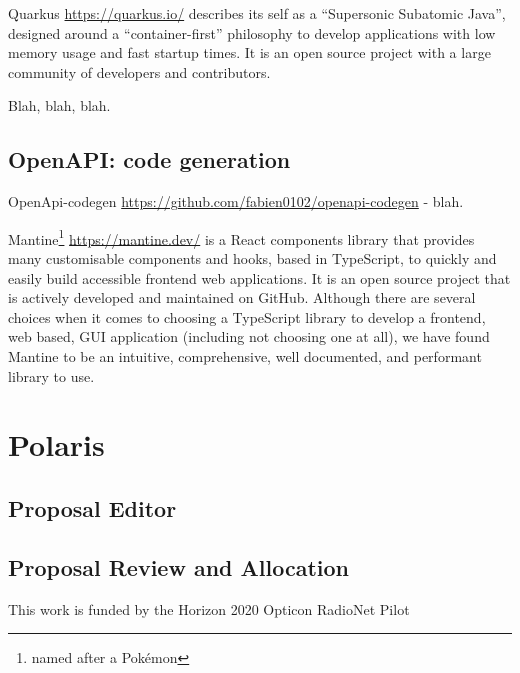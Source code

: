 \documentclass[11pt,twoside]{article}
\begin{document}
Quarkus \url{https://quarkus.io/} describes its self as a ``Supersonic Subatomic Java'', designed around a
``container-first'' philosophy to develop applications with low memory usage and fast startup times.
It is an open source project with a large community of developers and contributors.

Blah, blah, blah.

\subsection{OpenAPI: code generation}\label{subsec:openapi-code-generation}

OpenApi-codegen \url{https://github.com/fabien0102/openapi-codegen}  - blah.


Mantine\footnote{named after a Pok\'emon} \url{https://mantine.dev/} is a React components library that provides
many customisable components and hooks, based in TypeScript, to quickly and easily build accessible frontend web
applications.
It is an open source project that is actively developed and maintained on GitHub.
Although there are several choices when it comes to choosing a TypeScript library to develop a frontend, web based,
GUI application (including not choosing one at all), we have found Mantine to be an intuitive, comprehensive, well
documented, and performant library to use.



\section{Polaris}\label{sec:polaris}

\subsection{Proposal Editor}\label{subsec:proposal-editor}


\subsection{Proposal Review and Allocation}\label{subsec:proposal-review-and-allocation}



\acknowledgements This work is funded by the Horizon 2020 Opticon RadioNet Pilot


\end{document}
